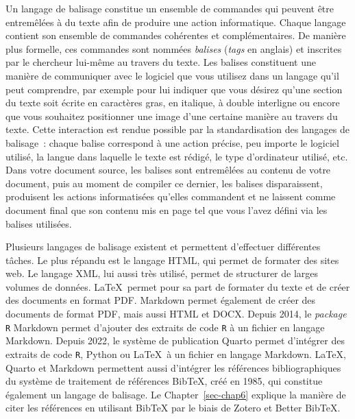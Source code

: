 \documentclass[
  letterpaper,
]{scrbook}
\begin{document}
Un langage de balisage constitue un ensemble de commandes qui peuvent
être entremêlées à du texte afin de produire une action informatique.
Chaque langage contient son ensemble de commandes cohérentes et
complémentaires. De manière plus formelle, ces commandes sont nommées
\emph{balises} (\emph{tags} en anglais) et inscrites par le chercheur
lui-même au travers du texte. Les balises constituent une manière de
communiquer avec le logiciel que vous utilisez dans un langage qu'il
peut comprendre, par exemple pour lui indiquer que vous désirez qu'une
section du texte soit écrite en caractères gras, en italique, à double
interligne ou encore que vous souhaitez positionner une image d'une
certaine manière au travers du texte. Cette interaction est rendue
possible par la standardisation des langages de balisage~: chaque balise
correspond à une action précise, peu importe le logiciel utilisé, la
langue dans laquelle le texte est rédigé, le type d'ordinateur utilisé,
etc. Dans votre document source, les balises sont entremêlées au contenu
de votre document, puis au moment de compiler ce dernier, les balises
disparaissent, produisent les actions informatisées qu'elles commandent
et ne laissent comme document final que son contenu mis en page tel que
vous l'avez défini via les balises utilisées.

Plusieurs langages de balisage existent et permettent d'effectuer
différentes tâches. Le plus répandu est le langage HTML, qui permet de
formater des sites web. Le langage XML, lui aussi très utilisé, permet
de structurer de larges volumes de données. \LaTeX~permet pour sa part
de formater du texte et de créer des documents en format PDF. Markdown
permet également de créer des documents de format PDF, mais aussi HTML
et DOCX. Depuis 2014, le \emph{package} \texttt{R} Markdown permet
d'ajouter des extraits de code \texttt{R} à un fichier en langage
Markdown. Depuis 2022, le système de publication Quarto permet
d'intégrer des extraits de code \texttt{R}, Python ou \LaTeX~à un
fichier en langage Markdown. \LaTeX, Quarto et Markdown permettent aussi
d'intégrer les références bibliographiques du système de traitement de
références BibTeX, créé en 1985, qui constitue également un langage de
balisage. Le Chapter~\ref{sec-chap6} explique la manière de citer les
références en utilisant BibTeX par le biais de Zotero et Better BibTeX.
\end{document}
